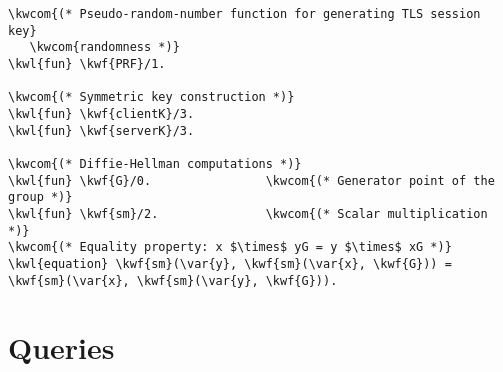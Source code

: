 \begin{Verbatim}[commandchars=\\\{\},codes={\catcode`$=3}]
\kwcom{(* Pseudo-random-number function for generating TLS session key}
   \kwcom{randomness *)}
\kwl{fun} \kwf{PRF}/1.

\kwcom{(* Symmetric key construction *)}
\kwl{fun} \kwf{clientK}/3.
\kwl{fun} \kwf{serverK}/3.

\kwcom{(* Diffie-Hellman computations *)}
\kwl{fun} \kwf{G}/0.                \kwcom{(* Generator point of the group *)}
\kwl{fun} \kwf{sm}/2.               \kwcom{(* Scalar multiplication *)}
\kwcom{(* Equality property: x $\times$ yG = y $\times$ xG *)}
\kwl{equation} \kwf{sm}(\var{y}, \kwf{sm}(\var{x}, \kwf{G})) = \kwf{sm}(\var{x}, \kwf{sm}(\var{y}, \kwf{G})).
\end{Verbatim}

\section{Queries}
